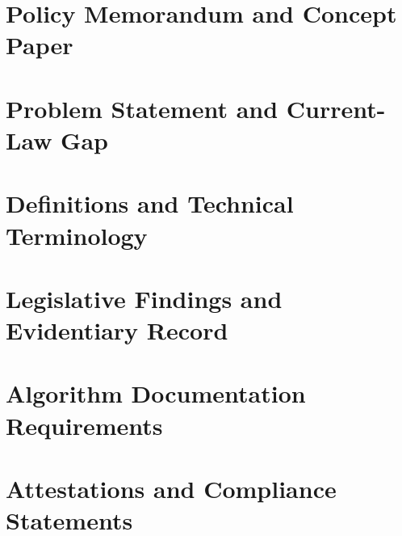 \documentclass[11pt]{article}
\begin{document}
\begin{abstract}

\end{abstract}


\vspace{0.2cm}

\section{Policy Memorandum and Concept Paper}
\label{sec:policy_memo}


\section{Problem Statement and Current-Law Gap}
\label{sec:problem_statement}


\section{Definitions and Technical Terminology}
\label{sec:definitions}


\section{Legislative Findings and Evidentiary Record}
\label{sec:findings}


\section{Algorithm Documentation Requirements}
\label{sec:algorithm_documentation}


\section{Attestations and Compliance Statements}
\label{sec:attestations_compliance}

\end{document}

